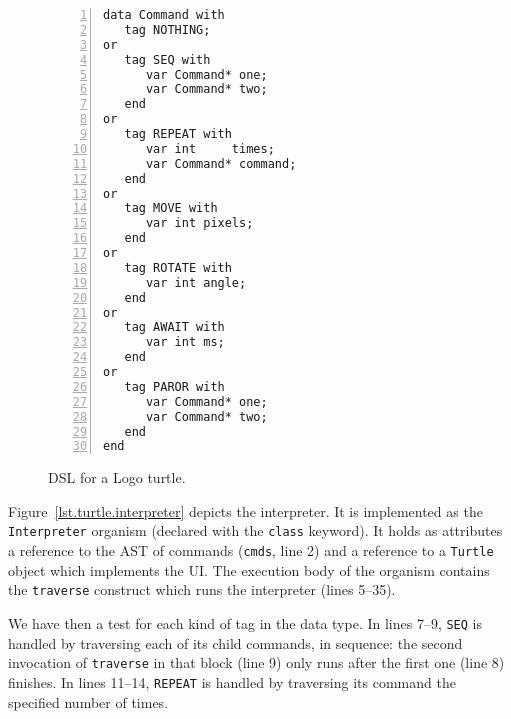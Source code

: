 \documentclass{acm_proc_article-sp}
\newcommand{\code}[1] {{\small{\texttt{#1}}}}
\begin{document}
\begin{comment}
The turtle has three attributes:
    a location
    an orientation
    a pen, itself having attributes such as color, width, and up versus down.
The turtle moves with commands that are relative to its own position, such as 
"move forward 10 spaces" and "turn left 90 degrees". The pen carried by the 
turtle can also be controlled, by enabling it, setting its color, or setting 
its width. A student could understand (and predict and reason about) the 
turtle's motion by imagining what they would do if they were the turtle.  
Seymour Papert called this "body syntonic" reasoning.
From these building blocks one can build more complex shapes like squares, 
triangles, circles and other composite figures. Combined with control flow, 
procedures, and recursion, the idea of turtle graphics is also useful in a 
Lindenmayer system for generating fractals.
Turtle geometry is also sometimes used in graphics environments as an 
alternative to a strictly coordinate-addressed graphics system.
\end{comment}

\begin{figure}%
\begin{lstlisting}[numbers=left,xleftmargin=3em]
data Command with
   tag NOTHING;
or
   tag SEQ with
      var Command* one;
      var Command* two;
   end
or
   tag REPEAT with
      var int     times;
      var Command* command;
   end
or
   tag MOVE with
      var int pixels;
   end
or
   tag ROTATE with
      var int angle;
   end
or
   tag AWAIT with
      var int ms;
   end
or
   tag PAROR with
      var Command* one;
      var Command* two;
   end
end
\end{lstlisting}
\caption{ DSL for a Logo turtle.
\label{lst.turtle.dsl}
}
\end{figure}

Figure~\ref{lst.turtle.interpreter} depicts the interpreter. It is implemented
as the \code{Interpreter} organism (declared with the \code{class} keyword).
It holds as attributes a reference to the AST of commands (\code{cmds}, line 2)
and a reference to a \code{Turtle} object which implements the UI. The
execution body of the organism contains the \code{traverse} construct which
runs the interpreter (lines 5--35).

We have then a test for each kind of tag in the data type. In lines 7--9,
\code{SEQ} is handled by traversing each of its child commands, in sequence:
the second invocation of \code{traverse} in that block (line 9) only runs
after the first one (line 8) finishes. In lines 11--14, \code{REPEAT} is
handled by traversing its command the specified number of times.
\end{document}
